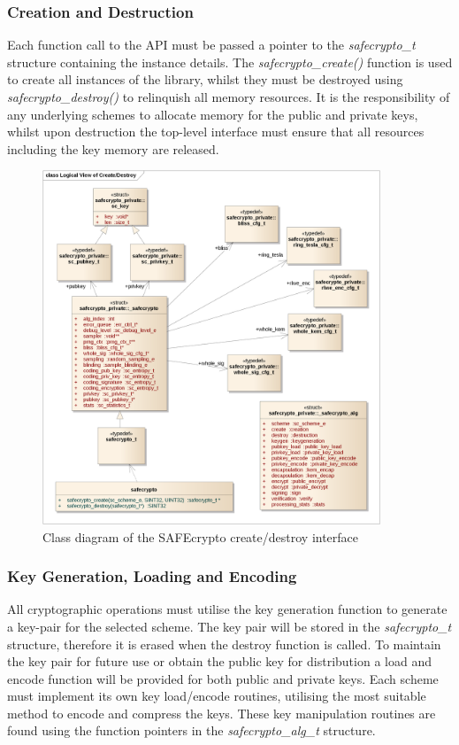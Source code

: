 \subsubsection{Creation and Destruction}

Each function call to the API must be passed a pointer to the \textit{safecrypto\_t} structure containing the instance details. The \textit{safecrypto\_create()} function is used to create all instances of the library, whilst they must be destroyed using \textit{safecrypto\_destroy()} to relinquish all memory resources. It is the responsibility of any underlying schemes to allocate memory for the public and private keys, whilst upon destruction the top-level interface must ensure that all resources including the key memory are released.

\begin{figure}[!h]
\centering
\includegraphics[width=0.9\textwidth]{libsafecrypto_create_logical_view.png}
\caption{Class diagram of the SAFEcrypto create/destroy interface}
\label{fig:safecrypto_instance}
\end{figure}


\subsubsection{Key Generation, Loading and Encoding}

All cryptographic operations must utilise the key generation function to generate a key-pair for the selected scheme. The key pair will be stored in the \textit{safecrypto\_t} structure, therefore it is erased when the destroy function is called. To maintain the key pair for future use or obtain the public key for distribution a load and encode function will be provided for both public and private keys. Each scheme must implement its own key load/encode routines, utilising the most suitable method to encode and compress the keys. These key manipulation routines are found using the function pointers in the \textit{safecrypto\_alg\_t} structure.

